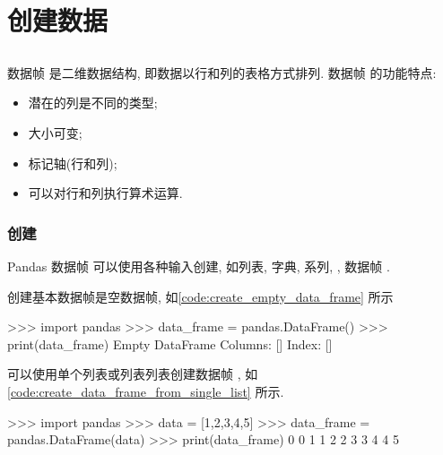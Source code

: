 \section{创建数据}
\subsection[DataFrame]{}
数据帧  是二维数据结构, 即数据以行和列的表格方式排列. 数据帧  的功能特点:%
%
\begin{itemize}
    \item 潜在的列是不同的类型;
    \item 大小可变;
    \item 标记轴(行和列);
    \item 可以对行和列执行算术运算.
\end{itemize}

\subsubsection{创建}
Pandas 数据帧  可以使用各种输入创建, 如列表, 字典, 系列, , 数据帧 .

创建基本数据帧是空数据帧, 如\cref{code:create_empty_data_frame} 所示%
%
\begin{codebox}[
  label = code:create_empty_data_frame,
  caption = 创建一个空的 \inlinetext{DataFrame}
]
>>> import pandas
>>> data_frame = pandas.DataFrame()
>>> print(data_frame)
Empty DataFrame
Columns: []
Index: []
\end{codebox}

可以使用单个列表或列表列表创建数据帧 , 如\cref{code:create_data_frame_from_single_list} 所示.%
%
\begin{codebox}[
  label = code:create_data_frame_from_single_list,
  caption = 用单个列表创建 \inlinetext{DataFrame}
]
>>> import pandas
>>> data = [1,2,3,4,5]
>>> data_frame = pandas.DataFrame(data)
>>> print(data_frame)
   0
0  1
1  2
2  3
3  4
4  5
\end{codebox}

